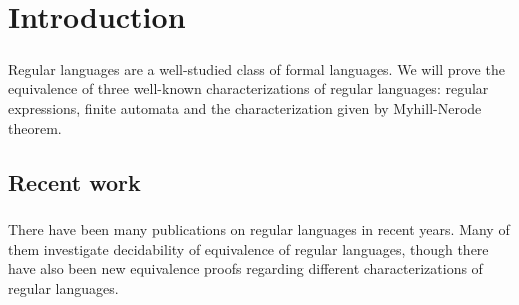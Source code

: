 \chapter{Introduction}

\paragraph{} 
Regular languages are a well-studied class of formal languages. 
We will prove the equivalence of three well-known characterizations of regular languages: regular expressions, finite automata and the characterization given by Myhill-Nerode theorem.

\section{Recent work}

\paragraph{} 
There have been many publications on regular languages in recent years. Many of them investigate decidability of equivalence of regular languages, though there have also been new equivalence proofs regarding different characterizations of regular languages.

